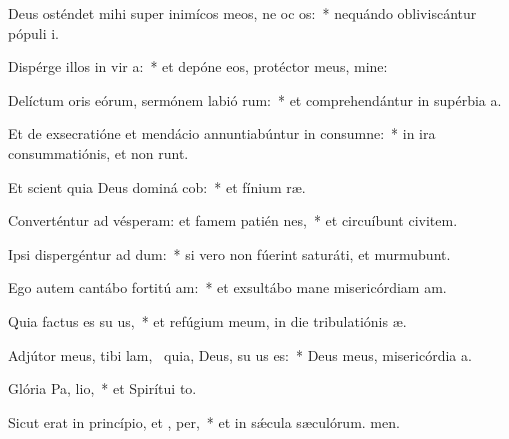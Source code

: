 \item Deus osténdet mihi super inimícos meos, ne oc os:~* nequándo obliviscántur pópuli i.
\item Dispérge illos in vir a:~* et depóne eos, protéctor meus, mine:
\item Delíctum oris eórum, sermónem labió rum:~* et comprehendántur in supérbia a.
\item Et de exsecratióne et mendácio annuntiabúntur in consumne:~* in ira consummatiónis, et non runt.
\item Et scient quia Deus dominá cob:~* et fínium ræ.
\item Converténtur ad vésperam: et famem patién  nes,~* et circuíbunt civitem.
\item Ipsi dispergéntur ad dum:~* si vero non fúerint saturáti, et murmubunt.
\item Ego autem cantábo fortitú am:~* et exsultábo mane misericórdiam am.
\item Quia factus es su us,~* et refúgium meum, in die tribulatiónis æ.
\item Adjútor meus, tibi lam,~\pscross{} quia, Deus, su us es:~* Deus meus, misericórdia a.
\item Glória Pa,  lio,~* et Spirítui to.
\item Sicut erat in princípio, et ,  per,~* et in sǽcula sæculórum. men.
